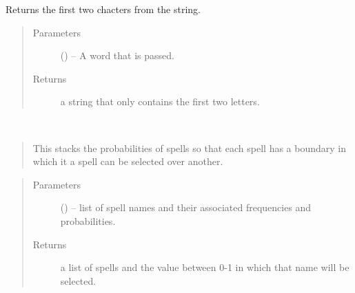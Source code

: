 \documentclass[letterpaper,10pt,english]{sphinxmanual}
\begin{document}

\begin{fulllineitems}
\label{code:hp_spells.f}
Returns the first two chacters from the string.
\begin{quote}\begin{description}
\item[{Parameters}] \leavevmode
{} () -- A word that is passed.

\item[{Returns}] \leavevmode
a string that only contains the first two letters.

\end{description}\end{quote}

\end{fulllineitems}


\begin{fulllineitems}
\label{code:hp_spells.generateScale}~\begin{quote}

This stacks the probabilities of spells so that each spell has a boundary in which it a spell can be selected over another.
\end{quote}
\begin{quote}\begin{description}
\item[{Parameters}] \leavevmode
{} (\sphinxstyleliteralemphasis{}\sphinxstyleliteralemphasis{{[}}\sphinxstyleliteralemphasis{}\sphinxstyleliteralemphasis{{[}}\sphinxstyleliteralemphasis{}\sphinxstyleliteralemphasis{{[}}\sphinxstyleliteralemphasis{,}\sphinxstyleliteralemphasis{{]}}\sphinxstyleliteralemphasis{}\sphinxstyleliteralemphasis{,}\sphinxstyleliteralemphasis{,}\sphinxstyleliteralemphasis{{]}}\sphinxstyleliteralemphasis{{]}}\sphinxstyleliteralemphasis{}) -- list of spell names and their associated frequencies and probabilities.

\item[{Returns}] \leavevmode
a list of spells and the value between 0-1 in which that name will be selected.

\end{description}\end{quote}

\end{fulllineitems}
\end{document}
